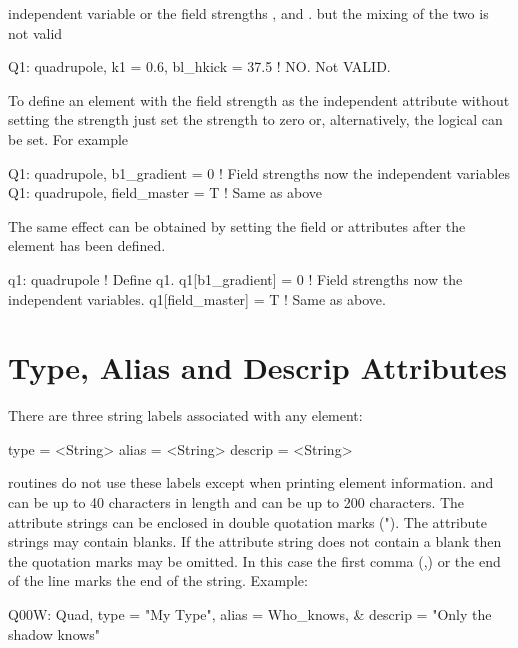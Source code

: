 independent variable or the field strengths ,  and
. but the mixing of the two is not valid
\begin{example}
  Q1: quadrupole, k1 = 0.6, bl_hkick = 37.5  ! NO. Not VALID.
\end{example}
To define an element with the field strength as the independent
attribute without setting the strength just set the strength to zero
or, alternatively, the  logical can be set. For
example
\begin{example}
  Q1: quadrupole, b1_gradient = 0   ! Field strengths now the independent variables
  Q1: quadrupole, field_master = T  ! Same as above
\end{example}
The same effect can be obtained by setting the field or  attributes
after the element has been defined.
\begin{example}
  q1: quadrupole        ! Define q1.
  q1[b1_gradient] = 0   ! Field strengths now the independent variables.
  q1[field_master] = T  ! Same as above.
\end{example}

\section{Type, Alias and Descrip Attributes}
\label{s:alias}

There are three string labels associated with any element:
\begin{example}
  type    = <String>
  alias   = <String>
  descrip = <String>
\end{example}
\bmad routines do not use these labels except when printing element
information.  and  can be up to 40 characters in
length and  can be up to 200 characters. The attribute
strings can be enclosed in double quotation marks ("). The attribute
strings may contain blanks. If the attribute string does not contain a
blank then the quotation marks may be omitted. In this case the first
comma (,) or the end of the line marks the end of the string. Example:
\begin{example}
  Q00W: Quad, type = "My Type", alias = Who_knows, &
                                  descrip = "Only the shadow knows"
\end{example}


